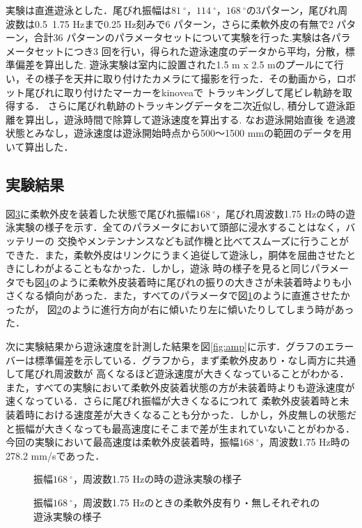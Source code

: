 実験は直進遊泳とした．尾びれ振幅は$81\:^\circ$，$114\:^\circ$，$168\:^\circ$の3パターン，尾びれ周波数は0.5~1.75 Hzまで0.25 Hz刻みで6 パターン，さらに柔軟外皮の有無で2 パターン，合計36 
パターンのパラメータセットについて実験を行った.実験は各パラメータセットにつき3 回を行い，得られた遊泳速度のデータから平均，分散，標準偏差を算出した.
遊泳実験は室内に設置された1.5 m x 2.5 mのプールにて行い，その様子を天井に取り付けたカメラにて撮影を行った．その動画から，ロボット尾びれに取り付けたマーカーをkinoveaで
トラッキングして尾ビレ軌跡を取得する．
さらに尾びれ軌跡のトラッキングデータを二次近似し, 積分して遊泳距離を算出し，遊泳時間で除算して遊泳速度を算出する. なお遊泳開始直後
を過渡状態とみなし，遊泳速度は遊泳開始時点から500～1500 mmの範囲のデータを用いて算出した．

\subsection{実験結果}
図\ref{fig:test_swim}に柔軟外皮を装着した状態で尾びれ振幅$168\:^\circ$，尾びれ周波数1.75 Hzの時の遊泳実験の様子を示す．全てのパラメータにおいて頭部に浸水することはなく，バッテリーの
交換やメンテンナンスなども試作機と比べてスムーズに行うことができた．また，柔軟外皮はリンクにうまく追従して遊泳し，胴体を屈曲させたときにしわがよることもなかった．しかし，遊泳
時の様子を見ると同じパラメータでも図\ref{fig:kukkyoku}のように柔軟外皮装着時に尾びれの振りの大きさが未装着時よりも小さくなる傾向があった．また，すべてのパラメータで図\ref{fig:str}のように直進させたかったが，
図\ref{fig:right}のように進行方向が右に傾いたり左に傾いたりしてしまう時があった．

次に実験結果から遊泳速度を計測した結果を図\ref{fig:amp}に示す．グラフのエラーバーは標準偏差を示している．グラフから，まず柔軟外皮あり・なし両方に共通して尾びれ周波数が
高くなるほど遊泳速度が大きくなっていることがわかる．また，すべての実験において柔軟外皮装着状態の方が未装着時よりも遊泳速度が速くなっている．さらに尾びれ振幅が大きくなるにつれて
柔軟外皮装着時と未装着時における速度差が大きくなることも分かった．しかし，外皮無しの状態だと振幅が大きくなっても最高速度にそこまで差が生まれていないことがわかる．
今回の実験において最高速度は柔軟外皮装着時，振幅$168\:^\circ$，周波数1.75 Hz時の278.2 mm/sであった．

\begin{figure}[htbp]
   \centering  
   \begin{subfigure}[b]{1\linewidth}
       \centering
       \label{fig:str}
   \end{subfigure}
   \begin{subfigure}[b]{1\linewidth}
       \centering
       \label{fig:right}
   \end{subfigure}
   \caption{振幅$168\:^\circ$，周波数1.75 Hzの時の遊泳実験の様子}
   \label{fig:test_swim}
\end{figure}
\begin{figure}[htbp]
    \centering
    \caption{振幅$168\:^\circ$，周波数1.75 Hzのときの柔軟外皮有り・無しそれぞれの遊泳実験の様子}
    \label{fig:kukkyoku}
\end{figure}

